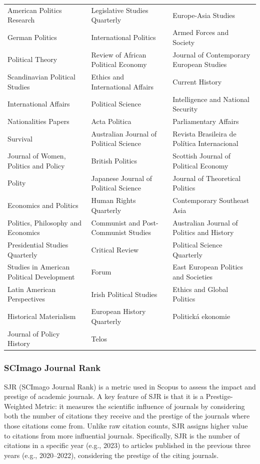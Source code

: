 \documentclass[12pt]{article}
\begin{document}
\begin{longtable}{p{}p{}p{}}
American Politics Research & Legislative Studies Quarterly & Europe-Asia Studies \\
German Politics & International Politics & Armed Forces and Society \\
Political Theory & Review of African Political Economy & Journal of Contemporary European Studies \\
Scandinavian Political Studies & Ethics and International Affairs & Current History \\
International Affairs & Political Science & Intelligence and National Security \\
Nationalities Papers & Acta Politica & Parliamentary Affairs \\
Survival & Australian Journal of Political Science & Revista Brasileira de Política Internacional \\
Journal of Women, Politics and Policy & British Politics & Scottish Journal of Political Economy \\
Polity & Japanese Journal of Political Science & Journal of Theoretical Politics \\
Economics and Politics & Human Rights Quarterly & Contemporary Southeast Asia \\
Politics, Philosophy and Economics & Communist and Post-Communist Studies & Australian Journal of Politics and History \\
Presidential Studies Quarterly & Critical Review & Political Science Quarterly \\
Studies in American Political Development & Forum & East European Politics and Societies \\
Latin American Perspectives & Irish Political Studies & Ethics and Global Politics \\
Historical Materialism & European History Quarterly & Politická ekonomie \\
Journal of Policy History & Telos & \\

\hline
\end{longtable}
\clearpage

\subsubsection*{SCImago Journal Rank}

SJR (SCImago Journal Rank) is a metric used in Scopus to assess the impact and prestige of
academic journals. A key feature of SJR is that it is a Prestige-Weighted Metric: it measures
the scientific influence of journals by considering both the number of citations they receive
and the prestige of the journals where those citations come from. Unlike raw citation counts,
SJR assigns higher value to citations from more influential journals. Specifically, SJR is the
number of citations in a specific year (e.g., 2023) to articles published in the previous three
years (e.g., 2020–2022), considering the prestige of the citing journals.
\end{document}
